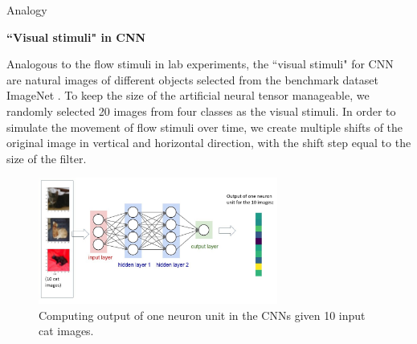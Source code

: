 \documentclass[xcolor={dvipsnames,svgnames}]{beamer}
\begin{document}
\begin{frame}[allowframebreaks]{Analogy}

\textbf{``Visual stimuli" in CNN}

Analogous to the flow stimuli in lab experiments, the ``visual stimuli" for CNN are natural images of different objects selected from the benchmark dataset ImageNet \cite{deng2009imagenet}. To keep the size of the artificial neural tensor manageable, we randomly selected 20 images from four classes as the visual stimuli. In order to simulate the movement of flow stimuli over time, we create multiple shifts of the original image in vertical and horizontal direction, with the shift step equal to the size of the filter. 
    \begin{figure}[H]
        \centering
            \includegraphics[width=0.7\textwidth]{figures/artificial/artificial-input-output.jpg}
            \caption{Computing output of one neuron unit in the CNNs given 10 input cat images.}
    \end{figure}
    

\end{frame}
\end{document}
